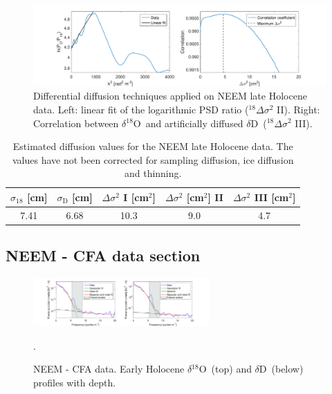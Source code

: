 \documentclass[11pt, draftcls, onecolumn]{IEEEtran} %
\numberwithin{equation}{section}
\numberwithin{table}{section}
\numberwithin{figure}{section}
\newcommand{\delOx}{$\delta{}^{18}\mathrm{O}$}
\newcommand{\delD}{$\delta\mathrm{D}$}
\begin{document}
\begin{appendices}
\begin{figure}[H]
	\vspace*{2mm}
	\begin{center}
		\includegraphics[width=1\textwidth]{Figure_20}
		\caption{Differential diffusion techniques applied on NEEM late Holocene data. 
				Left: linear fit of the logarithmic PSD ratio ($^{18}\Delta\sigma^2$ II). Right: 
				Correlation between \delOx~and artificially diffused \delD~($^{18}\Delta\sigma^2$ III).}  \label{fig:NEEM_late_fig_2}
	\end{center}
\end{figure}

\begin{table}[H]
	\center
	\caption{Estimated diffusion values for the NEEM late Holocene data.
			 The values have not been corrected for sampling diffusion, ice diffusion and thinning.}
	\label{NEEM_holo_tbl}
	\begin{tabular}{c c c c c} 
		\toprule
		$\sigma_{18}$ [cm] & $\sigma_\mathrm{D}$ [cm] & $\Delta\sigma^2$ I [cm$^2$] & $\Delta\sigma^2$ [cm$^2$] II & $\Delta\sigma^2$ III [cm$^2$] \\
		\midrule
		7.41 &   6.68 &    10.3 &     9.0 &     4.7 \\
		\bottomrule		
	\end{tabular}
\end{table}
\clearpage
\subsection{NEEM - CFA data section}

\begin{figure}[H]
	\vspace*{2mm}
	\begin{center}
		\includegraphics[width=0.6\textwidth]{Figure_21}
		\caption{NEEM - CFA data. Early Holocene \delOx~(top) and \delD~(below) profiles with depth.}  \label{fig:NEEM_CFA_holo}.
	\end{center}
\end{figure}


\end{appendices}
\end{document}
